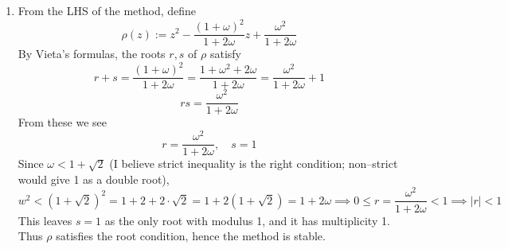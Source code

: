 \documentclass{article}
\newcommand{\imp}{\implies}
\newcommand{\om}{\omega}
\begin{document}
\begin{enumerate}[label=(\alph*)]
\item From the LHS of the method, define
$$\rho(z) := z^2 - \frac{(1+\om)^2}{1+2\om}z + \frac{\om^2}{1+2\om}$$
By Vieta's formulas, the roots $r,s$ of $\rho$ satisfy
$$r + s = \frac{(1+\om)^2}{1+2\om} = \frac{1+\om^2+2\om}{1+2\om} = \frac{\om^2}{1+2\om} + 1$$
$$rs = \frac{\om^2}{1+2\om}$$
From these we see
$$r = \frac{\om^2}{1+2\om},
\quad s = 1$$
Since $\om<1+\sqrt2$ (I believe strict inequality is the right condition; non--strict would give 1 as a double root),
$$w^2 < (1+\sqrt2)^2 = 1 + 2 + 2\cdot\sqrt2 = 1 + 2(1+\sqrt2) = 1 + 2\om
\imp 0 \le r = \frac{\om^2}{1+2\om} < 1
\imp |r|<1$$
This leaves $s=1$ as the only root with modulus 1, and it has multiplicity 1. Thus $\rho$ satisfies the root condition, hence the method is stable.

\end{enumerate}
	
\end{document}
